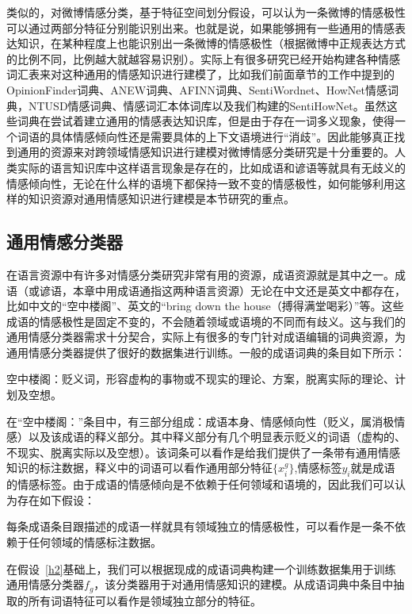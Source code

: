 类似的，对微博情感分类，基于特征空间划分假设，可以认为一条微博的情感极性可以通过两部分特征分别能识别出来。也就是说，如果能够拥有一些通用的情感表达知识，在某种程度上也能识别出一条微博的情感极性（根据微博中正规表达方式的比例不同，比例越大就越容易识别）。实际上有很多研究已经开始构建各种情感词汇表来对这种通用的情感知识进行建模了，比如我们前面章节的工作中提到的OpinionFinder词典、ANEW词典、AFINN词典、SentiWordnet、HowNet情感词典，NTUSD情感词典、情感词汇本体词库以及我们构建的SentiHowNet。虽然这些词典在尝试着建立通用的情感表达知识库，但是由于存在一词多义现象，使得一个词语的具体情感倾向性还是需要具体的上下文语境进行“消歧”。因此能够真正找到通用的资源来对跨领域情感知识进行建模对微博情感分类研究是十分重要的。人类实际的语言知识库中这样语言现象是存在的，比如成语和谚语等就具有无歧义的情感倾向性，无论在什么样的语境下都保持一致不变的情感极性，如何能够利用这样的知识资源对通用情感知识进行建模是本节研究的重点。

\subsection{通用情感分类器}
\label{general}
在语言资源中有许多对情感分类研究非常有用的资源，成语资源就是其中之一。成语（或谚语，本章中用成语通指这两种语言资源）无论在中文还是英文中都存在，比如中文的“空中楼阁”、英文的“bring down the house（搏得满堂喝彩）”等。这些成语的情感极性是固定不变的，不会随着领域或语境的不同而有歧义。这与我们的通用情感分类器需求十分契合，实际上有很多的专门针对成语编辑的词典资源，为通用情感分类器提供了很好的数据集进行训练。一般的成语词典的条目如下所示：
\begin{description}
\item{空中楼阁}：贬义词，形容虚构的事物或不现实的理论、方案，脱离实际的理论、计划及空想。
\end{description}
在“空中楼阁：”条目中，有三部分组成：成语本身、情感倾向性（贬义，属消极情感）以及该成语的释义部分。其中释义部分有几个明显表示贬义的词语（虚构的、不现实、脱离实际以及空想）。该词条可以看作是给我们提供了一条带有通用情感知识的标注数据，释义中的词语可以看作通用部分特征$\{x_i^g\}$,情感标签$y_i$就是成语的情感标签。由于成语的情感倾向是不依赖于任何领域和语境的，因此我们可以认为存在如下假设：

\begin{hypothesis}[条目情感极性假设]
\label{h2}
每条成语条目跟描述的成语一样就具有领域独立的情感极性，可以看作是一条不依赖于任何领域的情感标注数据。
\end{hypothesis}
在假设~\ref{h2}基础上，我们可以根据现成的成语词典构建一个训练数据集用于训练通用情感分类器$f_g$，该分类器用于对通用情感知识的建模。从成语词典中条目中抽取的所有词语特征可以看作是领域独立部分的特征。

